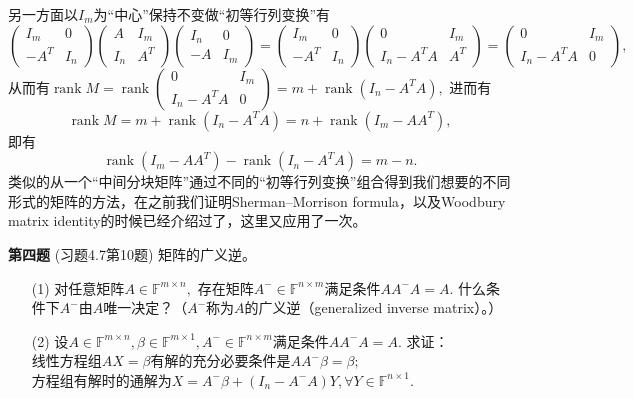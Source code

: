 另一方面以$I_m$为``中心''保持不变做``初等行列变换''有
$$\begin{pmatrix} I_m & 0 \\ -A^T & I_n \end{pmatrix} \begin{pmatrix} A & I_m \\ I_n & A^T \end{pmatrix} \begin{pmatrix} I_n & 0 \\ -A & I_m \end{pmatrix} = \begin{pmatrix} I_m & 0 \\ -A^T & I_n \end{pmatrix} \begin{pmatrix} 0 & I_m \\ I_n - A^TA & A^T \end{pmatrix} = \begin{pmatrix} 0 & I_m \\ I_n - A^TA & 0 \end{pmatrix},$$
从而有$\operatorname{rank} M = \operatorname{rank} \begin{pmatrix} 0 & I_m \\ I_n - A^TA & 0 \end{pmatrix} = m + \operatorname{rank} (I_n - A^TA),$ 进而有
$$\operatorname{rank}M = m + \operatorname{rank} (I_n - A^TA) = n + \operatorname{rank} (I_m - AA^T),$$
即有
$$\operatorname{rank}(I_m - AA^T) - \operatorname{rank}(I_n - A^TA) = m - n.$$
类似的从一个``中间分块矩阵''通过不同的``初等行列变换''组合得到我们想要的不同形式的矩阵的方法，在之前我们证明Sherman--Morrison formula，以及Woodbury matrix identity的时候已经介绍过了，这里又应用了一次。

\fi  %

\newpageorvspace

{\bf 第四题} (习题4.7第10题) 矩阵的广义逆。
\begin{itemize}
\item[(1)] 对任意矩阵$A \in \mathbb{F}^{m\times n},$ 存在矩阵$A^- \in \mathbb{F}^{n\times m}$满足条件$AA^-A = A.$ 什么条件下$A^-$由$A$唯一决定？（$A^-$称为$A$的广义逆（generalized inverse matrix）。）
\item[(2)] 设$A \in \mathbb{F}^{m\times n}, \beta \in \mathbb{F}^{m\times 1}, A^- \in \mathbb{F}^{n\times m}$满足条件$AA^-A = A.$ 求证：\\
线性方程组$AX = \beta$有解的充分必要条件是$AA^-\beta = \beta;$\\
方程组有解时的通解为$X = A^-\beta + (I_n - A^-A)Y, \forall Y \in \mathbb{F}^{n\times 1}.$
\end{itemize}

